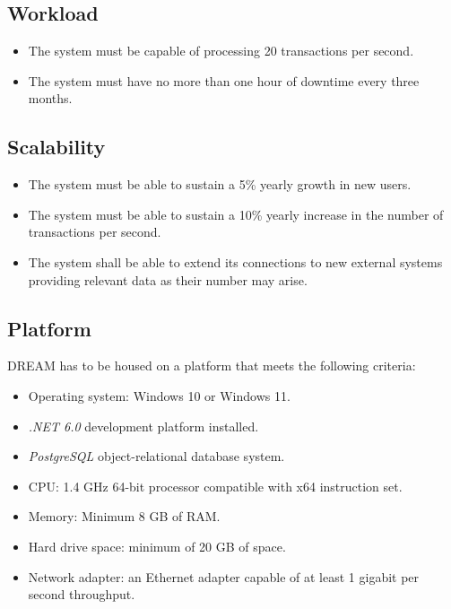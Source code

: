 \subsection{Workload}

\begin{itemize}
    \item The system must be capable of processing 20 transactions per second.
    \item The system must have no more than one hour of downtime every three months.
\end{itemize}

\subsection{Scalability}

\begin{itemize}
    \item The system must be able to sustain a 5\% yearly growth in new users.
    \item The system must be able to sustain a 10\% yearly increase in the number of transactions per second.
    \item The system shall be able to extend its connections to new external systems providing relevant data as their number may arise.
\end{itemize}

\subsection{Platform}

DREAM has to be housed on a platform that meets the following criteria:

\begin{itemize}
    \item Operating system: Windows 10 or Windows 11.    
    \item \textit{.NET 6.0} development platform installed.
    \item \textit{PostgreSQL} object-relational database system.
    \item CPU: 1.4 GHz 64-bit processor compatible with x64 instruction set.
    \item Memory: Minimum 8 GB of RAM. 
    \item Hard drive space: minimum of 20 GB of space.
    \item Network adapter: an Ethernet adapter capable of at least 1 gigabit per second throughput.
\end{itemize}

